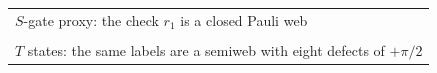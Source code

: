 \documentclass[border=3mm]{standalone}
\begin{document}
\begin{tabular}{@{}l@{}}
{\small\sffamily $S$-gate proxy: the check $r_1$ is a closed Pauli web}\\[1mm]
\\[4mm]
{\small\sffamily $T$ states: the same labels are a semiweb with eight defects of $+\pi/2$}\\[1mm]

\end{tabular}
\end{document}
